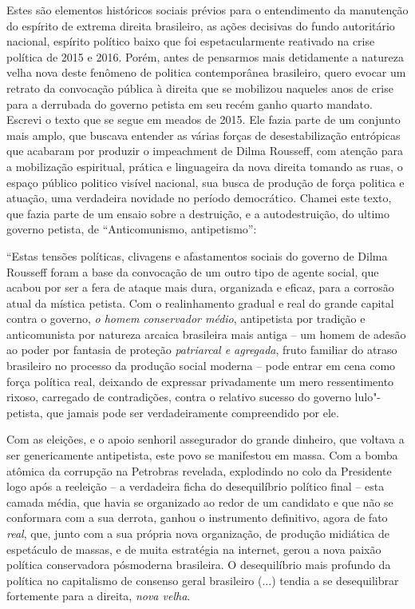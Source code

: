 Estes são elementos históricos sociais prévios para o entendimento da
manutenção do espírito de extrema direita brasileiro, as ações decisivas
do fundo autoritário nacional, espírito político baixo que foi
espetacularmente reativado na crise política de 2015 e 2016. Porém,
antes de pensarmos mais detidamente a natureza velha nova deste fenômeno
de politica contemporânea brasileiro, quero evocar um retrato da
convocação pública à direita que se mobilizou naqueles anos de crise
para a derrubada do governo petista em seu recém ganho quarto mandato.
Escrevi o texto que se segue em meados de 2015. Ele fazia parte de um
conjunto mais amplo, que buscava entender as várias forças de
desestabilização entrópicas que acabaram por produzir o impeachment de
Dilma Rousseff, com atenção para a mobilização espiritual, prática e
linguageira da nova direita tomando as ruas, o espaço público politico
visível nacional, sua busca de produção de força politica e atuação, uma
verdadeira novidade no período democrático. Chamei este texto, que fazia
parte de um ensaio sobre a destruição, e a autodestruição, do ultimo
governo petista, de ``Anticomunismo, antipetismo'':

``Estas tensões políticas, clivagens e afastamentos sociais do governo
de Dilma Rousseff foram a base da convocação de um outro tipo de agente
social, que acabou por ser a fera de ataque mais dura, organizada e
eficaz, para a corrosão atual da mística petista. Com o realinhamento
gradual e real do grande capital contra o governo, \emph{o homem
conservador médio}, antipetista por tradição e anticomunista por
natureza arcaica brasileira mais antiga -- um homem de adesão ao poder
por fantasia de proteção \emph{patriarcal e agregada}, fruto familiar do
atraso brasileiro no processo da produção social moderna -- pode entrar
em cena como força política real, deixando de expressar privadamente um
mero ressentimento rixoso, carregado de contradições, contra o relativo
sucesso do governo lulo"-petista, que jamais pode ser verdadeiramente
compreendido por ele.

Com as eleições, e o apoio senhoril assegurador do grande dinheiro, que
voltava a ser genericamente antipetista, este povo se manifestou em
massa. Com a bomba atômica da corrupção na Petrobras revelada,
explodindo no colo da Presidente logo após a reeleição -- a verdadeira
ficha do desequilíbrio político final -- esta camada média, que havia se
organizado ao redor de um candidato e que não se conformara com a sua
derrota, ganhou o instrumento definitivo, agora de fato \emph{real},
que, junto com a sua própria nova organização, de produção midiática de
espetáculo de massas, e de muita estratégia na internet, gerou a nova
paixão política conservadora pósmoderna brasileira. O desequilíbrio mais
profundo da política no capitalismo de consenso geral brasileiro (...)
tendia a se desequilibrar fortemente para a direita, \emph{nova velha}.

